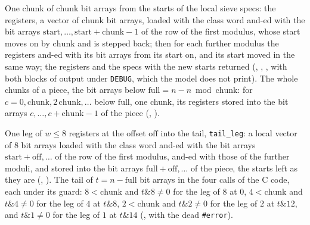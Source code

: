 \begin{definition}\label{def:chunkSieve}
  \leanok
  One chunk of $\mathrm{chunk}$ bit arrays from the starts of the local sieve specs: the registers,
  a vector of $\mathrm{chunk}$ bit arrays, loaded with the class word and-ed with the bit arrays
  $\mathrm{start}, \dots, \mathrm{start} + \mathrm{chunk} - 1$ of the row of the first modulus,
  whose start moves on by $\mathrm{chunk}$ and is stepped back; then for each further modulus the
  registers and-ed with its bit arrays from its start on, and its start moved in the same way; the
  registers and the specs with the new starts returned (,
  , , with both blocks of output under
  \verb|DEBUG|, which the model does not print). The whole chunks of a piece, the bit arrays below
  $\mathrm{full} = n - n \bmod \mathrm{chunk}$: for
  $c = 0, \mathrm{chunk}, 2\,\mathrm{chunk}, \dots$ below $\mathrm{full}$, one chunk, its registers
  stored into the bit arrays $c, \dots, c + \mathrm{chunk} - 1$ of the piece
  (, ).
\end{definition}

\begin{definition}\label{def:tailLegs}
  \leanok
  One leg of $w \le 8$ registers at the offset $\mathrm{off}$ into the tail, \verb|tail_leg|: a
  local vector of $8$ bit arrays loaded with the class word and-ed with the bit arrays
  $\mathrm{start} + \mathrm{off}, \dots$ of the row of the first modulus, and-ed with those of the
  further moduli, and stored into the bit arrays $\mathrm{full} + \mathrm{off}, \dots$ of the piece,
  the starts left as they are (, ). The tail of
  $t = n - \mathrm{full}$ bit arrays in the four calls of the C code, each under its guard:
  $8 < \mathrm{chunk}$ and $t \mathbin{\&} 8 \ne 0$ for the leg of $8$ at $0$, $4 < \mathrm{chunk}$
  and $t \mathbin{\&} 4 \ne 0$ for the leg of $4$ at $t \mathbin{\&} 8$, $2 < \mathrm{chunk}$ and
  $t \mathbin{\&} 2 \ne 0$ for the leg of $2$ at $t \mathbin{\&} 12$, and $t \mathbin{\&} 1 \ne 0$
  for the leg of $1$ at $t \mathbin{\&} 14$ (, with the dead
  \verb|#error|).
\end{definition}

